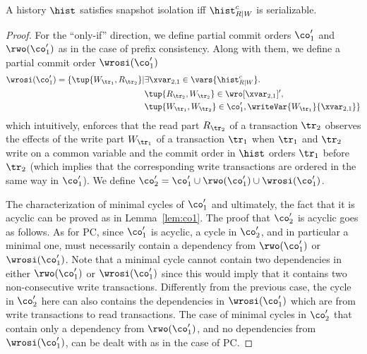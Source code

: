 \begin{theorem}\label{th:si:app}
A history $\hist$ satisfies snapshot isolation iff $\hist_{R|W}^c$ is serializable.
\end{theorem}
\begin{proof}
For the ``only-if'' direction, we define partial commit orders $\co_1'$ and $\rwo(\co_1')$ as in the case of prefix consistency. Along with them, we define a partial commit order $\wrosi(\co_1')$ 
\begin{align*}
 \wrosi(\co'_1) = \{\tup{W_{\tr_1}, R_{\tr_2}}| & \exists \xvar_{2,1} \in \vars{\hist_{R|W}^c}.\                             \\
                                & \tup{R_{\tr_2},W_{\tr_2}} \in \wro[\xvar_{2,1}]', \\
                                & \tup{W_{\tr_1}, W_{\tr_2}} \in \co'_1, \writeVar{W_{\tr_1}}{\xvar_{2,1}} \} 
\end{align*}
which intuitively, enforces that the read part $R_{\tr_2}$ of a transaction $\tr_2$ observes the effects of the write part $W_{\tr_1}$ of a transaction $\tr_1$ when $\tr_1$ and $\tr_2$ write on a common variable and the commit order in $\hist$ orders $\tr_1$ before $\tr_2$ (which implies that the corresponding write transactions are ordered in the same way in $\co'_1$). We define $\co_2' = \co_1' \cup \rwo(\co_1') \cup \wrosi(\co'_1)$. 

The characterization of minimal cycles of $\co_1'$ and ultimately, the fact that it is acyclic can be proved as in Lemma~\ref{lem:co1}. The proof that $\co_2'$ is acyclic goes as follows. As for PC, since $\co'_1$ is acyclic, a cycle in $\co'_2$, and in particular a minimal one, must  necessarily contain a dependency from $\rwo(\co'_1)$ or $\wrosi(\co'_1)$. Note that a minimal cycle cannot contain two dependencies in either $\rwo(\co'_1)$ or $\wrosi(\co'_1)$ since this would imply that it contains two non-consecutive write transactions. Differently from the previous case, the cycle in $\co_2'$ here can also contains the dependencies in $\wrosi(\co'_1)$ which are from write transactions to read transactions. %
The case of minimal cycles in $\co'_2$ that contain only a dependency from $\rwo(\co'_1)$, and no dependencies from $\wrosi(\co'_1)$, can be dealt with as in the case of PC. 


\end{proof}
